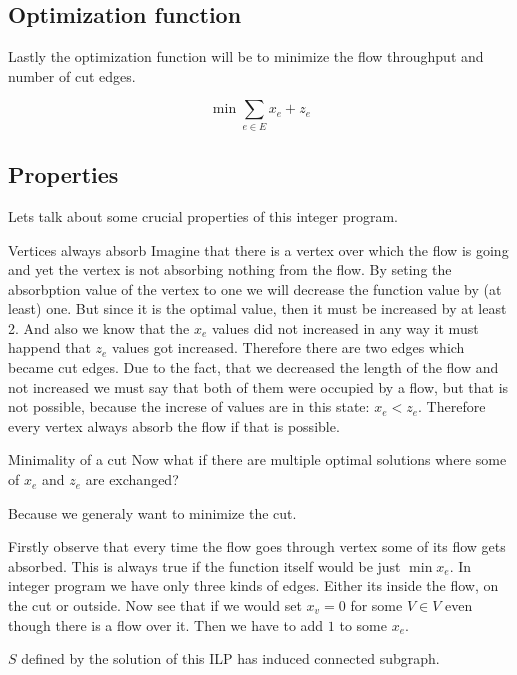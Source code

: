 \documentclass{article}
\begin{document}
	\subsection{Optimization function}
	
	Lastly the optimization function will be to minimize the flow throughput and number of cut edges.
	
	$$
	\min \sum_{e \in E} x_e + z_e
	$$
	
	\subsection{Properties}
	
	Lets talk about some crucial properties of this integer program.
		
	\begin{observation}{Vertices always absorb}
		Imagine that there is a vertex over which the flow is going and yet the vertex is not absorbing nothing from the flow. By seting the absorbption value of the vertex to one we will decrease the function value by (at least) one. But since it is the optimal value, then it must be increased by at least 2. And also we know that the $x_e$ values did not increased in any way it must happend that $z_e$ values got increased. Therefore there are two edges which became cut edges. Due to the fact, that we decreased the length of the flow and not increased we must say that both of them were occupied by a flow, but that is not possible, because the increse of values are in this state: $x_e < z_e$. Therefore every vertex always absorb the flow if that is possible.
	\end{observation}
	
	\begin{observation}{Minimality of a cut}
		Now what if there are multiple optimal solutions where some of $x_e$ and $z_e$ are exchanged?
		
		Because we generaly want to minimize the cut.
	\end{observation}
	
	\begin{todo}
		Firstly observe that every time the flow goes through vertex some of its flow gets absorbed. This is always true if the function itself would be just $\min x_e$. In integer program we have only three kinds of edges. Either its inside the flow, on the cut or outside. Now see that if we would set $x_v = 0$ for some $V \in V$ even though there is a flow over it. Then we have to add $1$ to some $x_e$.
		
		$S$ defined by the solution of this ILP has induced connected subgraph.
	\end{todo}
\end{document}
